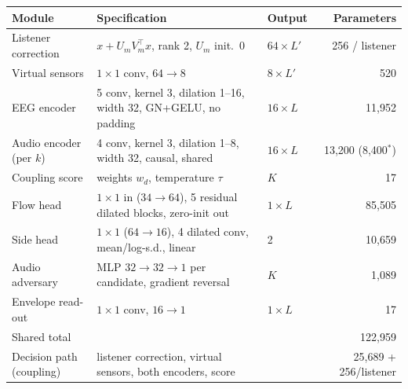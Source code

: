 \begin{tabular}{lp{}lr}\toprule
Module & Specification & Output & Parameters\\\midrule
Listener correction & $x+U_m V_m^{\top}x$, rank 2, $U_m$ init.\ 0 & $64\times L'$ & 256 / listener\\
Virtual sensors & $1{\times}1$ conv, $64\to8$ & $8\times L'$ & 520\\
EEG encoder & 5 conv, kernel 3, dilation 1--16, width 32, GN+GELU, no padding & $16\times L$ & 11{,}952\\
Audio encoder (per $k$) & 4 conv, kernel 3, dilation 1--8, width 32, causal, shared & $16\times L$ & 13{,}200 (8{,}400$^\ast$)\\
Coupling score & weights $w_d$, temperature $\tau$ & $K$ & 17\\
Flow head & $1{\times}1$ in ($34\to64$), 5 residual dilated blocks, zero-init out & $1\times L$ & 85{,}505\\
Side head & $1{\times}1$ ($64\to16$), 4 dilated conv, mean/log-s.d., linear & 2 & 10{,}659\\
Audio adversary & MLP $32\to32\to1$ per candidate, gradient reversal & $K$ & 1{,}089\\
Envelope read-out & $1{\times}1$ conv, $16\to1$ & $1\times L$ & 17\\
\midrule
Shared total & & & 122{,}959\\
Decision path (coupling) & listener correction, virtual sensors, both encoders, score & & 25{,}689 + 256/listener\\
\bottomrule\end{tabular}
